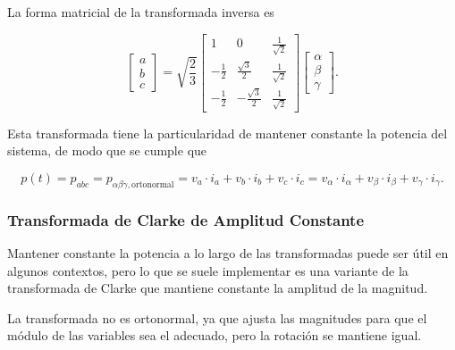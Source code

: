 La forma matricial de la transformada inversa es

\begin{equation}
    \begin{bmatrix}
        a \\
        b \\
        c
    \end{bmatrix}
    =
    \sqrt{\frac{2}{3}}
    \begin{bmatrix}
        1 & 0 & \frac{1}{\sqrt{2}} \\
        -\frac{1}{2} & \frac{\sqrt{3}}{2} & \frac{1}{\sqrt{2}} \\
        -\frac{1}{2} & -\frac{\sqrt{3}}{2} & \frac{1}{\sqrt{2}}
    \end{bmatrix}
    \begin{bmatrix}
        \alpha \\
        \beta \\
        \gamma
    \end{bmatrix} \text{.}
\end{equation}

Esta transformada tiene la particularidad de mantener constante la potencia del sistema, de modo que se cumple que

\begin{equation}
p(t) = p_{abc} = p_{\alpha\beta\gamma, \text{ortonormal}} = v_a \cdot i_a + v_b \cdot i_b + v_c \cdot i_c = v_\alpha \cdot i_\alpha + v_\beta \cdot i_\beta + v_\gamma \cdot i_\gamma \text{.}
\end{equation}

\subsubsection{Transformada de Clarke de Amplitud Constante}

Mantener constante la potencia a lo largo de las transformadas puede ser útil en algunos contextos, pero lo que se suele implementar es una variante de la transformada de Clarke que mantiene constante la amplitud de la magnitud.

La transformada no es ortonormal, ya que ajusta las magnitudes para que el módulo de las variables sea el adecuado, pero la rotación se mantiene igual.


